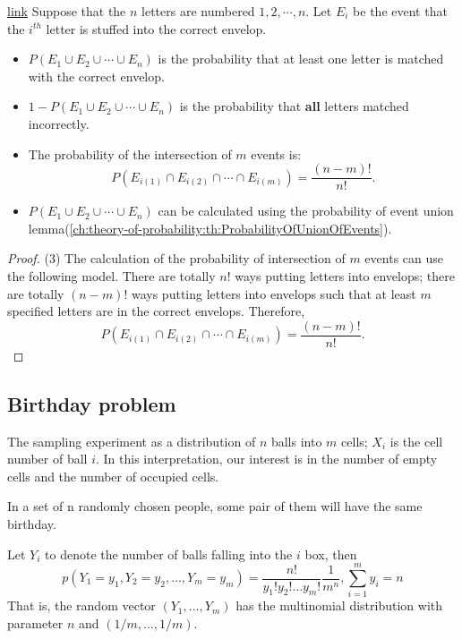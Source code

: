 \begin{refsection}
\begin{lemma}\href{https://probabilityandstats.wordpress.com/2010/02/18/the-matching-problem/}{link}
Suppose that the $n$ letters are numbered $1,2, \cdots, n$. Let $E_i$ be the event that the $i^{th}$ letter is stuffed into the correct envelop. 
\begin{itemize}
	\item $P(E_1 \cup E_2 \cup \cdots \cup E_n)$ is the probability that at least one letter is matched with the correct envelop.
	\item $1 -P(E_1 \cup E_2 \cup \cdots \cup E_n) $ is the probability that \textbf{all} letters matched incorrectly.
	\item The probability of the intersection of $m$ events is:
$$ P(E_{i(1)} \cap E_{i(2)} \cap \cdots \cap E_{i(m)})=\frac{(n-m)!}{n!}.$$
	\item $P(E_1 \cup E_2 \cup \cdots \cup E_n)$ can be calculated using the probability of event union lemma(\autoref{ch:theory-of-probability:th:ProbabilityOfUnionOfEvents}).
\end{itemize}
\end{lemma}
\begin{proof}
(3)  The calculation of the probability of intersection of $m$ events can use the following model. There are totally $n!$ ways putting letters into envelops; there are totally $(n-m)!$ ways putting letters into envelops such that at least $m$ specified letters are in the correct envelops. Therefore, 
$$P(E_{i(1)} \cap E_{i(2)} \cap \cdots \cap E_{i(m)})=\frac{(n-m)!}{n!}.$$
\end{proof}


\subsection{Birthday problem}

\begin{definition}
The sampling experiment as a distribution of $n$ balls into $m$ cells; $X_i$ is the cell number of ball $i$. In this interpretation, our interest is in the number of empty cells and the number of occupied cells.	
\end{definition}


\begin{example}
In a set of n randomly chosen people, some pair of them will have the same birthday.
\end{example}


\begin{lemma}
Let $Y_i$ to denote the number of balls falling into the $i$ box, then
$$p(Y_1=y_1,Y_2=y_2,\dots,Y_m=y_m) = \frac{n!}{y_1!y_2!\dots y_m!}\frac{1}{m^n}, \sum_{i=1}^m y_i = n$$
That is, the random vector $(Y_1,...,Y_m)$ has the multinomial distribution with parameter $n$ and $(1/m,...,1/m)$.
\end{lemma}




\end{refsection}
